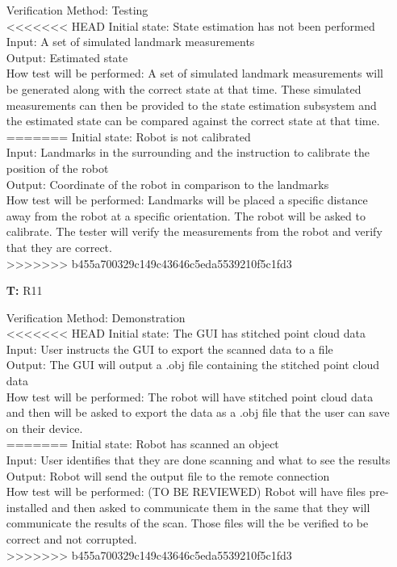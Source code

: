 \documentclass[12pt, titlepage]{article}
\newcounter{tnum} %
\begin{document}
\begin{itemize}
Verification Method: Testing\\
<<<<<<< HEAD
Initial state: State estimation has not been performed \\
Input: A set of simulated landmark measurements \\
Output: Estimated state\\
How test will be performed: A set of simulated landmark measurements will be generated along with the correct state at that time. These simulated measurements can then be provided to the state estimation subsystem and the estimated state can be compared against the correct state at that time.   \\
=======
Initial state: Robot is not calibrated \\
Input: Landmarks in the surrounding and the instruction to calibrate the position of the robot \\
Output: Coordinate of the robot in comparison to the landmarks\\
How test will be performed: Landmarks will be placed a specific distance away from the robot at a specific orientation. The robot will be asked to calibrate. The tester will verify the measurements from the robot and verify that they are correct. \\
>>>>>>> b455a700329c149c43646c5eda5539210f5c1fd3

\item[\textbf{T\refstepcounter{tnum}\thetnum:}]{R11\\}

Verification Method: Demonstration\\
<<<<<<< HEAD
Initial state: The GUI has stitched point cloud data\\
Input: User instructs the GUI to export the scanned data to a file\\
Output: The GUI will output a .obj file containing the stitched point cloud data  \\
How test will be performed: The robot will have stitched point cloud data and then will be asked to export the data as a .obj file that the user can save on their device. \\
=======
Initial state: Robot has scanned an object \\
Input: User identifies that they are done scanning and what to see the results \\
Output: Robot will send the output file to the remote connection  \\
How test will be performed: (TO BE REVIEWED) Robot will have files pre-installed and then asked to communicate them in the same that they will communicate the results of the scan. Those files will the be verified to be correct and not corrupted. \\
>>>>>>> b455a700329c149c43646c5eda5539210f5c1fd3


\end{itemize}
\end{document}
